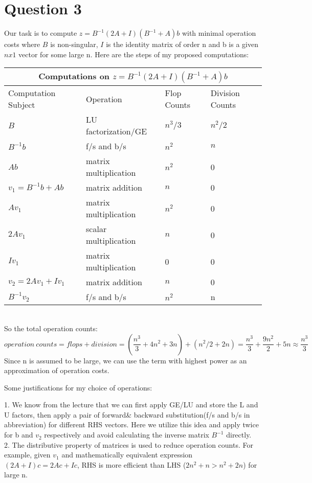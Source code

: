 \documentclass[12pt]{article}
\begin{document}
\section{Question 3}

Our task is to compute $z = B^{-1}(2A+I)(B^{-1}+A)b$ with minimal operation costs where $B$ is non-singular, $I$ is the identity matrix of order n and b is a given $n x 1$ vector for some large n. Here are the steps of my proposed computations:

\begin{tabular}{ |p{3cm}||p{4cm}|p{1.5cm}|p{1.5cm}| }
 \hline
 \multicolumn{4}{|c|}{Computations on $z = B^{-1}(2A+I)(B^{-1}+A)b$} \\
 \hline
 Computation Subject & Operation & Flop Counts & Division Counts \\
 \hline
 $B$ & LU factorization/GE & $n^3/3$ & $n^2/2$  \\
 $B^{-1}b$ & f/s and b/s & $n^2$ & $n$ \\
 $Ab$ & matrix multiplication & $n^2$ &  0 \\
 $v_1 = B^{-1}b+Ab$ & matrix addition & $n$ & 0\\
 $Av_1$ & matrix multiplication & $n^2$ &0\\
 $2Av_1$& scalar multiplication  &  $n$  &0 \\
 $Iv_1$& matrix multiplication  & 0 &0 \\
 $v_2 = 2Av_1 + Iv_1$ & matrix addition & $n$ &0\\
 $B^{-1}v_2$ & f/s and b/s & $n^2$ & n \\
 \hline
\end{tabular}\\
So the total operation counts:
\begin{equation*}
operation\ counts = flops + division = (\frac{n^3}{3} +4n^2 + 3n) + (n^2/2 + 2n) = \frac{n^3}{3} + \frac{9n^2}{2} + 5n \approx \frac{n^3}{3}
\end{equation*}
Since n is assumed to be large, we can use the term with highest power as an approximation of operation costs. 

Some justifications for my choice of operations:

1. We know from the lecture that we can first apply GE/LU and store the L and U factors, then apply a pair of forward& backward substitution(f/s and b/s in abbreviation) for different RHS vectors. Here we utilize this idea and apply twice for b and $v_2$ respectively and avoid calculating the inverse matrix $B^{-1}$ directly. \\

2. The distributive property of matrices is used to reduce operation counts. For example, given $v_1$ and mathematically equivalent expression $(2A+I)c = 2Ac + Ic$, RHS is more efficient than LHS ($2n^2+n > n^2 + 2n$) for large n.
\end{document}
